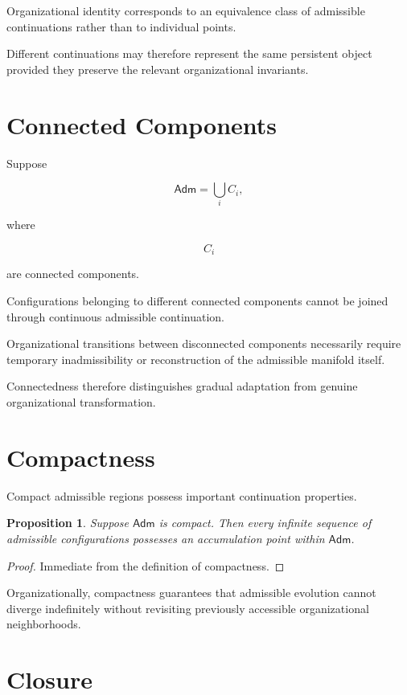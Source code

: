 \documentclass[11pt,oneside]{book}
\numberwithin{equation}{chapter}
\theoremstyle{definition}
\theoremstyle{plain}
\newtheorem{proposition}[definition]{Proposition}
\newcommand{\Adm}{\mathsf{Adm}}
\begin{document}
Organizational identity corresponds to an equivalence class of admissible
continuations rather than to individual points.

Different continuations may therefore represent the same persistent object
provided they preserve the relevant organizational invariants.

\section{Connected Components}

Suppose

\[
\Adm
=
\bigcup_i
C_i,
\]

where

\[
C_i
\]

are connected components.

Configurations belonging to different connected components cannot be
joined through continuous admissible continuation.

Organizational transitions between disconnected components necessarily
require temporary inadmissibility or reconstruction of the admissible
manifold itself.

Connectedness therefore distinguishes gradual adaptation from genuine
organizational transformation.

\section{Compactness}

Compact admissible regions possess important continuation properties.

\begin{proposition}
Suppose \(\Adm\) is compact. Then every infinite sequence of admissible
configurations possesses an accumulation point within \(\Adm\).
\end{proposition}

\begin{proof}
Immediate from the definition of compactness.
\end{proof}

Organizationally, compactness guarantees that admissible evolution cannot
diverge indefinitely without revisiting previously accessible
organizational neighborhoods.

\section{Closure}
\end{document}

